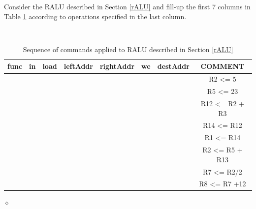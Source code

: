 \begin{problem}
Consider the RALU described in Section \ref{rALU} and fill-up the first 7 columns in Table \ref{aluSeq} according to operations specified in the last column.

\begin{table}[H]
  \begin{center}
    \caption{Sequence of commands applied to RALU described in Section \ref{rALU}}
    \label{aluSeq}
    \vspace{2mm}
    {\tt
    \begin{tabular}{|c|c|c|c|c|c|c||c|}
    \hline
    func &  in & load & leftAddr & rightAddr & we & destAddr & COMMENT          \\ \hline \hline
     &   &     &     &      &   &     & R2 <= 5         \\ \hline
     &   &     &     &      &   &     & R5 <= 23        \\ \hline
     &   &     &     &      &   &     & R12 <= R2 + R3 	\\ \hline
     &   &     &     &      &   &     & R14 <= R12      \\ \hline
     &   &     &     &      &   &     & R1 <= R14       \\ \hline
     &   &     &     &      &   &     & R2 <= R5 + R13  \\ \hline
     &   &     &     &      &   &     & R7 <= R2/2      \\ \hline
     &   &     &     &      &   &     & R8 <= R7 +12    \\ \hline
 \end{tabular}
 }
  \end{center}
\end{table}


$\diamond$
\end{problem}
